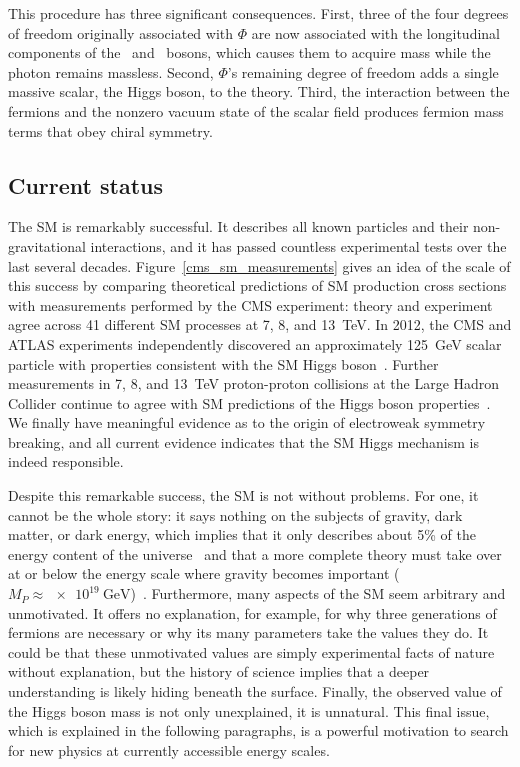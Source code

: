 This procedure has three significant consequences. First, three of the four degrees of freedom originally associated with $\Phi$ are now associated with the longitudinal components of the \PWpm\ and \cPZ\ bosons, which causes them to acquire mass while the photon remains massless. Second, $\Phi$'s remaining degree of freedom adds a single massive scalar, the Higgs boson, to the theory. Third, the interaction between the fermions and the nonzero vacuum state of the scalar field produces fermion mass terms that obey chiral symmetry.

\subsection{Current status}
\label{sm_status}
The SM is remarkably successful. It describes all known particles and their non-gravitational interactions, and it has passed countless experimental tests over the last several decades. Figure~\ref{cms_sm_measurements} gives an idea of the scale of this success by comparing theoretical predictions of SM production cross sections with measurements performed by the CMS experiment: theory and experiment agree across 41 different SM processes at \num{7}, \num{8}, and \SI{13}{\TeV}. In 2012, the CMS and ATLAS experiments  independently discovered an approximately \SI{125}{\GeV} scalar particle with properties consistent with the SM Higgs boson~\cite{cms_higgs, atlas_higgs}. Further measurements in \num{7}, \num{8}, and \SI{13}{\TeV} proton-proton collisions at the Large Hadron Collider continue to agree with SM predictions of the Higgs boson properties~\cite{cms_higgs_summary, atlas_higgs_summary}. We finally have meaningful evidence as to the origin of electroweak symmetry breaking, and all current evidence indicates that the SM Higgs mechanism is indeed responsible.



Despite this remarkable success, the SM is not without problems. For one, it cannot be the whole story: it says nothing on the subjects of gravity, dark matter, or dark energy, which implies that it only describes about 5\% of the energy content of the universe~\cite{fukugita_2004} and that a more complete theory must take over at or below the energy scale where gravity becomes important ($M_{P}\approx\SI{e19}{\GeV}$)~\cite{giudice_naturalness_2008}. Furthermore, many aspects of the SM seem arbitrary and unmotivated. It offers no explanation, for example, for why three generations of fermions are necessary or why its many parameters take the values they do. It could be that these unmotivated values are simply experimental facts of nature without explanation, but the history of science implies that a deeper understanding is likely hiding beneath the surface. Finally, the observed value of the Higgs boson mass is not only unexplained, it is unnatural. This final issue, which is explained in the following paragraphs, is a powerful motivation to search for new physics at currently accessible energy scales.

